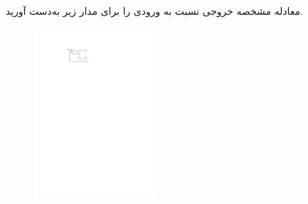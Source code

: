 

معادله مشخصه خروجی نسبت به ورودی را برای مدار زیر به‌دست آورید.

\begin{figure}[h]
	\centering
	\includegraphics[width=0.4\textwidth]{fig/Q_basic3.pdf}
	\label{fig:Q_basic_3_a}
\end{figure}